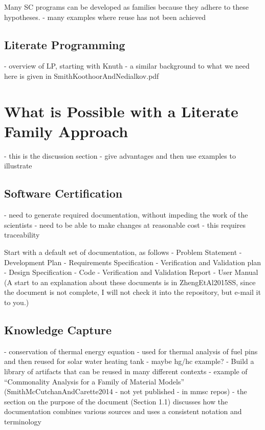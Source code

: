 \documentclass[10pt, preprint]{sigplanconf}
\begin{document}
Many SC programs can be developed as families because they adhere to these hypotheses. 
- many examples where reuse has not been achieved

\subsection{Literate Programming}
\label{subsec:literate}

- overview of LP, starting with Knuth - a similar background to what we need here is given in SmithKoothoorAndNedialkov.pdf

\section{What is Possible with a Literate Family Approach}
\label{sec:what}

- this is the discussion section - give advantages and then use examples to illustrate

\subsection{Software Certification}
\label{subsec:software}

- need to generate required documentation, without impeding the work of the scientists
- need to be able to make changes at reasonable cost - this requires traceability

Start with a default set of documentation, as follows
	- Problem Statement
	- Development Plan
	- Requirements Specification
	- Verification and Validation plan
	- Design Specification
	- Code
	- Verification and Validation Report
	- User Manual
(A start to an explanation about these documents is in ZhengEtAl2015SS, since the document is not complete, I will not check it into the repository, but e-mail it to you.)

\subsection{Knowledge Capture}
\label{subsec:knowledge}

- conservation of thermal energy equation - used for thermal analysis of fuel pins and then reused for solar water heating tank
- maybe hg/hc example?
- Build a library of artifacts that can be reused in many different contexts
- example of “Commonality Analysis for a Family of Material Models” (SmithMcCutchanAndCarette2014 - not yet published - in mmsc repos) - the section on the purpose of the document (Section 1.1) discusses how the documentation combines various sources and uses a consistent notation and terminology
\end{document}
